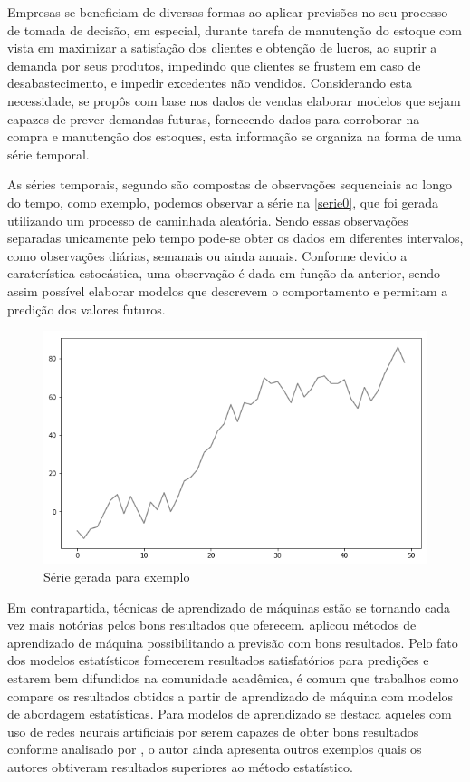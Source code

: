 \documentclass[
    12pt,
    oneside,
    a4paper,
    english,
    brazil
]{abntex2}
\begin{document}
Empresas se beneficiam de diversas formas ao aplicar previsões no seu processo
de tomada de decisão, em especial, durante tarefa de manutenção do estoque com
vista em maximizar a satisfação dos clientes e obtenção de lucros, ao suprir a
demanda por seus produtos, impedindo que clientes se frustem em caso de
desabastecimento, e impedir excedentes não vendidos. Considerando esta
necessidade, se propôs com base nos dados de vendas elaborar modelos que sejam
capazes de prever demandas futuras, fornecendo dados para corroborar na compra
e manutenção dos estoques, esta informação se organiza na forma de uma série
temporal.

As séries temporais, segundo  são compostas de observações
sequenciais ao longo do tempo, como exemplo, podemos observar a série na
\autoref{serie0}, que foi gerada utilizando um processo de caminhada aleatória.
Sendo essas observações separadas unicamente pelo tempo pode-se obter os dados
em diferentes intervalos, como observações diárias, semanais ou ainda anuais.
Conforme  devido a caraterística estocástica, uma observação
é dada em função da anterior, sendo assim possível elaborar modelos que
descrevem o comportamento e permitam a predição dos valores futuros.

\begin{figure}[ht]
    \centering
    \caption{Série gerada para exemplo}\label{serie0}
    \includegraphics[width=.6\linewidth]{images/serie_exemplo.png}
\end{figure}


Em contrapartida, técnicas de aprendizado de máquinas estão se tornando cada
vez mais notórias pelos bons resultados que oferecem. 
aplicou métodos de aprendizado de máquina possibilitando a previsão com bons
resultados.  Pelo fato dos modelos estatísticos fornecerem resultados
satisfatórios para predições e estarem bem difundidos na comunidade acadêmica,
é comum que trabalhos como  compare os resultados obtidos
a partir de aprendizado de máquina com modelos de abordagem estatísticas. Para
modelos de aprendizado se destaca aqueles com uso de redes neurais artificiais
por serem capazes de obter bons resultados conforme analisado por
, o autor ainda apresenta outros exemplos quais os autores
obtiveram resultados superiores ao método estatístico.
\end{document}
